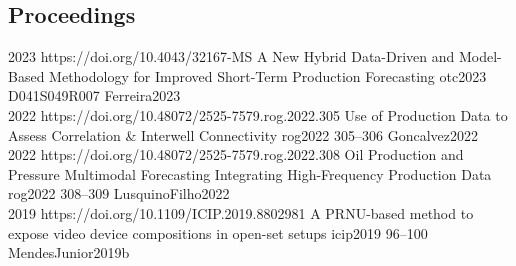 \subsection*{Proceedings}

\begin{publications}
  {
  }
  {2023}
  {https://doi.org/10.4043/32167-MS}
  {A New Hybrid Data-Driven and Model-Based Methodology for Improved Short-Term Production Forecasting}
  {otc2023}
  {D041S049R007}
  {}
  {Ferreira2023}
  \\

  {
  }
  {2022}
  {https://doi.org/10.48072/2525-7579.rog.2022.305}
  {Use of Production Data to Assess Correlation \& Interwell Connectivity}
  {rog2022}
  {305--306}
  {}
  {Goncalvez2022}
  \\

  {
  }
  {2022}
  {https://doi.org/10.48072/2525-7579.rog.2022.308}
  {Oil Production and Pressure Multimodal Forecasting Integrating High-Frequency Production Data}
  {rog2022}
  {308--309}
  {}
  {LusquinoFilho2022}
  \\

  {
  }
  {2019}
  {https://doi.org/10.1109/ICIP.2019.8802981}
  {A PRNU-based method to expose video device compositions in open-set setups}
  {icip2019}
  {96--100}
  {}
  {MendesJunior2019b}
  \\


\end{publications}
